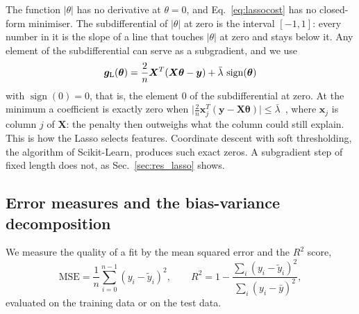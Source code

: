 \documentclass[aps,reprint,amsmath,amssymb,nofootinbib,floatfix]{revtex4-2}
\newcommand{\lb}{\bar\lambda}
\DeclareMathOperator{\sign}{sign}
\begin{document}
The function $|\theta|$ has no derivative at $\theta=0$, and Eq.~\eqref{eq:lassocost} has no
closed-form minimiser. The subdifferential of $|\theta|$ at zero is the interval $[-1,1]$: every
number in it is the slope of a line that touches $|\theta|$ at zero and stays below it. Any element
of the subdifferential can serve as a subgradient, and we use
\begin{equation}
  \bm g_{\rm L}(\bm\theta)=\frac2n\bm X^T(\bm X\bm\theta-\bm y)+\lb\,\sign(\bm\theta)
  \label{eq:lassograd}
\end{equation}
with $\sign(0)=0$, that is, the element 0 of the subdifferential at zero. At the minimum a coefficient is exactly zero when
$\lvert\frac2n\bm x_j^T(\bm y-\bm X\bm\theta)\rvert\le\lb$~\cite{hjorthjensen2026}, where $\bm x_j$ is
column $j$ of $\bm X$: the penalty then outweighs what the column could still explain. This is how
the Lasso selects features. Coordinate descent with soft thresholding, the algorithm of
Scikit-Learn, produces such exact zeros. A subgradient step of fixed length does not, as
Sec.~\ref{sec:res_lasso} shows.

\subsection{Error measures and the bias-variance decomposition}\label{sec:biasvar}

We measure the quality of a fit by the mean squared error and the $R^2$ score,
\begin{equation}
  \mathrm{MSE}=\frac1n\sum_{i=0}^{n-1}(y_i-\tilde y_i)^2,\qquad
  R^2=1-\frac{\sum_i(y_i-\tilde y_i)^2}{\sum_i(y_i-\bar y)^2},
  \label{eq:mse}
\end{equation}
evaluated on the training data or on the test data.
\end{document}
